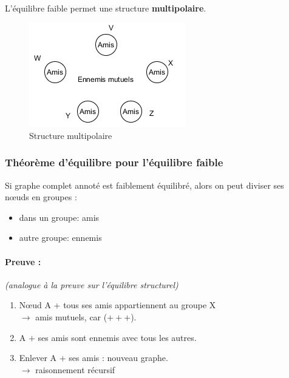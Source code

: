 \paragraph{}
L'équilibre faible permet une structure \textbf{multipolaire}.

\begin{figure}[h!]
\label{fig:multipolaire}
\caption{Structure multipolaire}
\centering
\includegraphics[scale=1]{images/22_etoile-amis.png}
\end{figure}



\subsubsection*{Théorème d'équilibre pour l'équilibre faible}

Si graphe complet annoté est faiblement équilibré, alors on peut diviser ses nœuds en groupes :

\begin{itemize}


\item dans un groupe: amis

\item autre groupe: ennemis

\end{itemize}

\paragraph{Preuve : } \textit{(analogue à la preuve sur l'équilibre structurel)}


\begin{enumerate}

\item Nœud A + tous ses amis appartiennent au groupe X \\
$\to$ amis mutuels, car ($+++$).

\item A $+$ ses amis sont ennemis avec tous les autres.

\item Enlever A $+$ ses amis : nouveau graphe.\\
$\to$ raisonnement récursif

\end{enumerate}
